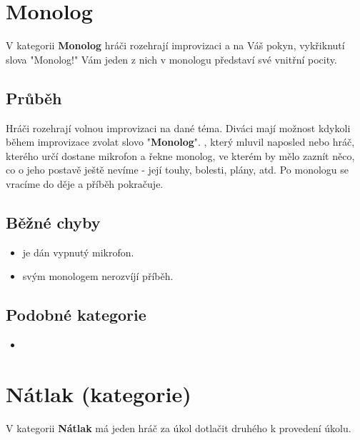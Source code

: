 
 
 
 
\needspace{5cm} \section{Monolog} \label{monolog}  
 
 
V kategorii \textbf{Monolog}{} hráči rozehrají improvizaci a na Váš pokyn, vykřiknutí slova "Monolog!"{} Vám jeden z nich v monologu představí své vnitřní pocity. 
 
 
\subsection{Průběh} Hráči rozehrají volnou improvizaci na dané téma. Diváci mají možnost kdykoli během improvizace zvolat slovo "\textbf{Monolog}{}". , který mluvil naposled nebo hráč, kterého určí  dostane mikrofon a řekne monolog, ve kterém by mělo zaznít něco, co o jeho postavě ještě nevíme - její touhy, bolesti, plány, atd. Po monologu se vracíme do děje a příběh pokračuje.  
 
\subsection{ Běžné chyby } \begin{itemize}
\item {} je dán vypnutý mikrofon.
\item {} svým monologem nerozvíjí příběh.
\end{itemize}
 
 
\subsection{ Podobné kategorie } \begin{itemize}
\item {}
\end{itemize}
 
 
 
 
\needspace{5cm} \section{Nátlak (kategorie)} \label{nátlak (kategorie)}  
 
V kategorii \textbf{Nátlak}{} má jeden hráč za úkol dotlačit druhého k provedení úkolu. 
 
